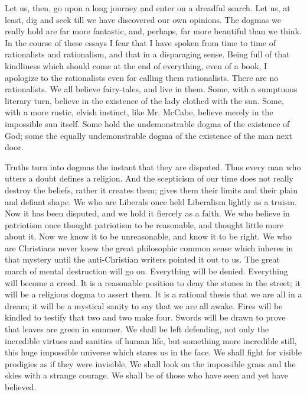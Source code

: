 Let us, then, go upon a long journey and enter on a dreadful search. Let us, at least, dig and seek till we have discovered our own opinions. The dogmas we really hold are far more fantastic, and, perhaps, far more beautiful than we think. In the course of these essays I fear that I have spoken from time to time of rationalists and rationalism, and that in a disparaging sense. Being full of that kindliness which should come at the end of everything, even of a book, I apologize to the rationalists even for calling them rationalists. There are no rationalists. We all believe fairy-tales, and live in them. Some, with a sumptuous literary turn, believe in the existence of the lady clothed with the sun. Some, with a more rustic, elvish instinct, like Mr. McCabe, believe merely in the impossible sun itself. Some hold the undemonstrable dogma of the existence of God; some the equally undemonstrable dogma of the existence of the man next door.

Truths turn into dogmas the instant that they are disputed. Thus every man who utters a doubt defines a religion. And the scepticism of our time does not really destroy the beliefs, rather it creates them; gives them their limits and their plain and defiant shape. We who are Liberals once held Liberalism lightly as a truism. Now it has been disputed, and we hold it fiercely as a faith. We who believe in patriotism once thought patriotism to be reasonable, and thought little more about it. Now we know it to be unreasonable, and know it to be right. We who are Christians never knew the great philosophic common sense which inheres in that mystery until the anti-Christian writers pointed it out to us. The great march of mental destruction will go on. Everything will be denied. Everything will become a creed. It is a reasonable position to deny the stones in the street; it will be a religious dogma to assert them. It is a rational thesis that we are all in a dream; it will be a mystical sanity to say that we are all awake. Fires will be kindled to testify that two and two make four. Swords will be drawn to prove that leaves are green in summer. We shall be left defending, not only the incredible virtues and sanities of human life, but something more incredible still, this huge impossible universe which stares us in the face. We shall fight for visible prodigies as if they were invisible. We shall look on the impossible grass and the skies with a strange courage. We shall be of those who have seen and yet have believed.
